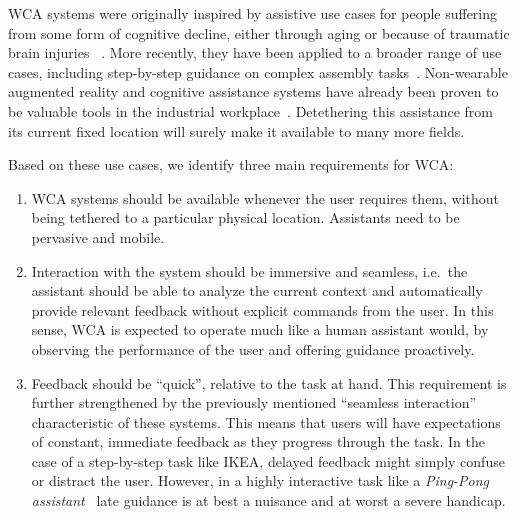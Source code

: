 \documentclass[10pt,letterpaper]{article}
\providecommand{\DIFaddtex}[1]{#1} %
\providecommand{\DIFdeltex}[1]{} %
\providecommand{\DIFaddbegin}{\protect\color{blue}} %
\providecommand{\DIFaddend}{\protect\color{black}} %
\providecommand{\DIFdelbegin}{\protect\color{red}} %
\providecommand{\DIFdelend}{\protect\color{black}} %
\providecommand{\DIFadd}[1]{\texorpdfstring{\DIFaddtex{#1}}{#1}} %
\providecommand{\DIFdel}[1]{\texorpdfstring{\DIFdeltex{#1}}{}} %
\newcommand{\DIFscaledelfig}{0.5}
\newlength{\DIFdelgraphicswidth} %
\newlength{\DIFdelgraphicsheight} %
\newcommand{\DIFaddincludegraphics}[2][]{{\color{blue}\fbox{\DIFOincludegraphics[#1]{#2}}}} %
\newcommand{\DIFdelincludegraphics}[2][]{%
\sbox{\DIFdelgraphicsbox}{\DIFOincludegraphics[#1]{#2}}%
\settoboxwidth{\DIFdelgraphicswidth}{\DIFdelgraphicsbox} %
\settoboxtotalheight{\DIFdelgraphicsheight}{\DIFdelgraphicsbox} %
\scalebox{\DIFscaledelfig}{%
\parbox[b]{\DIFdelgraphicswidth}{\usebox{\DIFdelgraphicsbox}\\[-\baselineskip] \rule{\DIFdelgraphicswidth}{0em}}\llap{\resizebox{\DIFdelgraphicswidth}{\DIFdelgraphicsheight}{%
\setlength{\unitlength}{\DIFdelgraphicswidth}%
\begin{picture}(1,1)%
\thicklines\linethickness{2pt} %
{\color[rgb]{1,0,0}\put(0,0){\framebox(1,1){}}}%
{\color[rgb]{1,0,0}\put(0,0){\line( 1,1){1}}}%
{\color[rgb]{1,0,0}\put(0,1){\line(1,-1){1}}}%
\end{picture}%
}\hspace*{3pt}}} %
} %
\DeclareRobustCommand{\DIFaddbegin}{\DIFOaddbegin \let\includegraphics\DIFaddincludegraphics} %
\DeclareRobustCommand{\DIFaddend}{\DIFOaddend \let\includegraphics\DIFOincludegraphics} %
\DeclareRobustCommand{\DIFdelbegin}{\DIFOdelbegin \let\includegraphics\DIFdelincludegraphics} %
\DeclareRobustCommand{\DIFdelend}{\DIFOaddend \let\includegraphics\DIFOincludegraphics} %
\begin{document}
WCA systems \DIFdelbegin \DIFdel{show great potential for two main use-cases.
One is providing quality of life improvements to the millions of people around the world affected by }\DIFdelend \DIFaddbegin \DIFadd{were originally inspired by assistive use cases for people suffering from }\DIFaddend some form of cognitive decline\DIFdelbegin \DIFdel{. 
WCA can, for instance, provide assistance to people recovering from }\DIFdelend \DIFaddbegin \DIFadd{, either through aging or because of }\DIFaddend traumatic brain injuries\DIFdelbegin \DIFdel{, smoothly guiding them through day-to-day interactions with the world which would otherwise be extremely challenging.
} \DIFdel{The second use-case is as a companion tool for specialists and as a means for guiding their training}\DIFdelend \DIFaddbegin \DIFadd{~}\autocite{Ha:TowardsWearableCogAssist,satya2019augmenting}\DIFadd{.
More recently, they have been applied to a broader range of use cases, including step-by-step guidance on complex assembly tasks~}\autocite{Chen:AnEmpiricalStudyOfLatency}\DIFaddend .
Non-wearable augmented reality and cognitive assistance systems have already been proven to be valuable tools in the industrial workplace~\autocite{funk2015caworkplace,gorecky2011cognito}.
Detethering this assistance from its current fixed location will surely make it available to many more fields. 

Based on these use cases, we identify three main requirements for WCA:\@
\begin{enumerate}
    \item\label{item:pervasive} WCA systems should be available whenever the user requires them, without being tethered to a particular physical location. Assistants need to be pervasive and mobile.

    \item\label{item:interaction} Interaction with the system should be immersive and seamless, i.e.\ the assistant should be able to analyze the current context and automatically provide relevant feedback without explicit commands from the user.
    In this sense, WCA is expected to operate much like a human assistant would, by observing the performance of the user and offering guidance proactively.

    \item\label{item:lowlatency} Feedback should be ``quick'', relative to the task at hand. 
    This requirement is further strengthened by the previously mentioned ``seamless interaction'' characteristic of these systems.
    This means that users will have expectations of constant, immediate feedback as they progress through the task.
    In the case of a step-by-step task like IKEA, delayed feedback might simply confuse or distract the user.
    However, in a highly interactive task like a \emph{Ping-Pong assistant}~\autocite{PingPongAssistant, Chen:EarlyImplementation} late guidance is at best a nuisance and at worst a severe handicap.
\end{enumerate}
\end{document}
